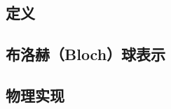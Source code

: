 
\begin{issues}
\issueDraft
\end{issues}

\subsection{定义}

\subsection{布洛赫（Bloch）球表示}

\subsection{物理实现}